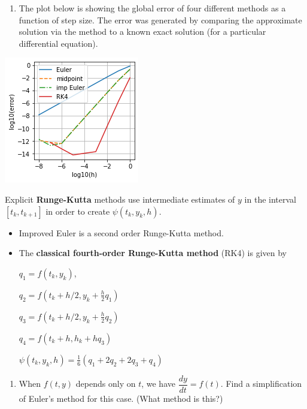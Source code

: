 \documentclass[12pt,letterpaper,noanswers]{exam}
\begin{document}
\begin{enumerate}[resume=classQ]
    \item The plot below is showing the global error of four different methods as a function of step size.  The error was generated by comparing the approximate solution via the method to a known exact solution (for a particular differential equation).
    
      
\end{enumerate}
\includegraphics[]{img/C18error.png}
\begin{tcolorbox}
Explicit \textbf{Runge-Kutta} methods use intermediate estimates of $y$ in the interval $[t_k,t_{k+1}]$ in order to create $\psi(t_k,y_k,h)$.  
\begin{itemize}
\itemsep0pt
    \item Improved Euler is a second order Runge-Kutta method.
    \item The \textbf{classical fourth-order Runge-Kutta method} (RK4) is given by 
    
    $q_1 = f(t_k,y_k)$, 
    
    $q_2 = f(t_k+h/2,y_k+\frac{h}{2}q_1)$
    
    $q_3 = f(t_k + h/2,y_k + \frac{h}{2}q_2)$
    
    $q_4 = f(t_k+h, h_k + hq_3)$
    
    $\psi(t_k,y_k,h) = \frac{1}{6}(q_1+2q_2+2q_3+q_4)$
\end{itemize}
\end{tcolorbox}
\begin{enumerate}[resume=classQ]
\item When $f(t,y)$ depends only on $t$, we have $\dfrac{dy}{dt} = f(t)$.  Find a simplification of Euler's method for this case.  (What method is this?)
\vspace{1in}
\end{enumerate}
\end{document}
